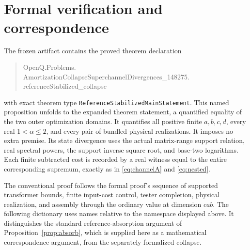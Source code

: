 \documentclass[11pt]{article}
\newcommand{\code}[1]{{\small\nolinkurl{#1}}}
\theoremstyle{remark}
\begin{document}
\section{Formal verification and correspondence}
The frozen artifact contains the proved theorem declaration
\begin{quote}\small\ttfamily
OpenQ.Problems.\\
AmortizationCollapseSuperchannelDivergences\_148275.\\
referenceStabilized\_collapse
\end{quote}
with exact theorem type
\code{ReferenceStabilizedMainStatement}. This named proposition unfolds to
the expanded theorem statement, a quantified equality of the two outer
optimization domains. It quantifies all positive
finite $a,b,c,d$, every real $1<\alpha\leq2$, and every pair of bundled
physical realizations. It imposes no extra premise. Its state divergence
uses the actual matrix-range support relation, real spectral powers, the
support inverse square root, and base-two logarithms. Each finite subtracted
cost is recorded by a real witness equal to the entire corresponding
supremum, exactly as in \eqref{eq:channelA} and \eqref{eq:nested}.

The conventional proof follows the formal proof's sequence of supported
transformer bounds, finite input-cost control, tester completion, physical
realization, and assembly through the ordinary value at dimension $cab$.
The following dictionary uses names relative to the namespace displayed
above. It distinguishes the standard reference-absorption argument of
Proposition~\ref{prop:absorb}, which is supplied here as a mathematical
correspondence argument, from the separately formalized collapse.
\end{document}
